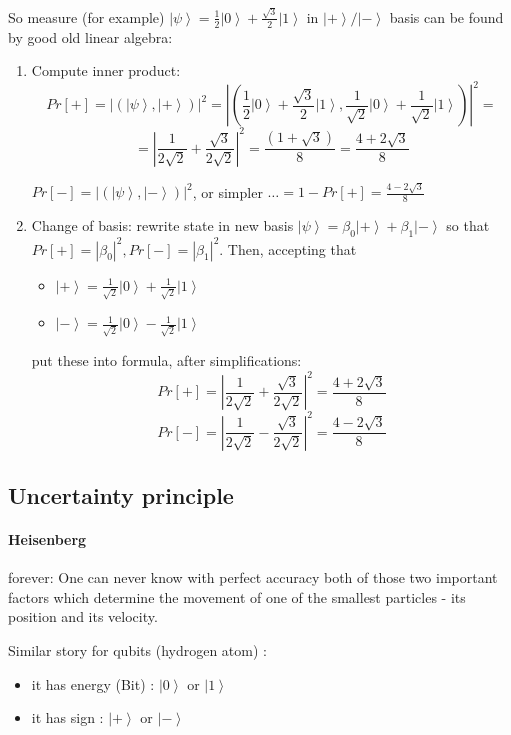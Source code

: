 \documentclass{scrartcl}
\newcommand{\ket}[1]{\left| #1 \right>} %
\begin{document}
So measure (for example) $\ket\psi = \frac1{2} \ket0 + \frac{\sqrt{3}}{2}\ket1$
in $\ket+ / \ket-$ basis can be found by good old linear algebra:
\begin{enumerate}
\item Compute inner product:
  \[ Pr[+] = |(\ket\psi, \ket+)|^2 = \left|\left(\frac1{2}\ket0 +
      \frac{\sqrt{3}}{2}\ket1, \frac1{\sqrt{2}}\ket0 + \frac1{\sqrt{2}}\ket1
    \right)\right|^2 =\]
  \[ = \left| \frac1{2 \sqrt{2}} + \frac{\sqrt{3}}{2\sqrt{2}} \right|^2 =
  \frac{(1 + \sqrt{3})} {8} = \frac{4 + 2 \sqrt{3}}8 \]

  $ Pr[-] = |(\ket\psi, \ket-)|^2$, or simpler $\dots = 1 - Pr[+] = \frac{4 - 2
    \sqrt{3}}{8}$
\item Change of basis: rewrite state in new basis $\ket\psi = \beta_0 \ket+ +
  \beta_1 \ket-$ so that $Pr[+] = |\beta_0|^2, Pr[-] = |\beta_1|^2$. Then,
  accepting that
  \begin{itemize}
  \item $\ket+ = \frac1{\sqrt{2}} \ket0 + \frac1{\sqrt{2}} \ket1$
  \item $\ket- = \frac1{\sqrt{2}} \ket0 - \frac1{\sqrt{2}} \ket1$
  \end{itemize}
  put these into formula, after simplifications:
  \[ Pr[+] = | \frac1{2 \sqrt{2}} + \frac{\sqrt{3}}{2\sqrt{2}} |^2 = \frac{4 + 2
    \sqrt{3}}{8} \]
  \[ Pr[-] = | \frac1{2 \sqrt{2}} - \frac{\sqrt{3}}{2\sqrt{2}} |^2 = \frac{4 - 2
    \sqrt{3}}{8} \]
\end{enumerate}

\subsection{Uncertainty principle}
\label{sec:2-4}

\paragraph{Heisenberg}forever: One can never know with perfect accuracy both of
those two important factors which determine the movement of one of the smallest
particles - its position and its velocity.

Similar story for qubits (hydrogen atom) :
\begin{itemize}
\item it has energy (Bit) : $\ket0$ or $\ket1$
\item it has sign : $\ket+$ or $\ket-$
\end{itemize}
\end{document}
